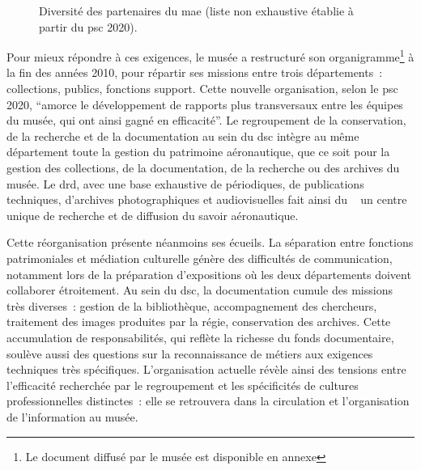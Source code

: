 \begin{figure}[htbp]
	
	\caption{Diversité des partenaires du \ac{mae} (liste non exhaustive établie à partir du \ac{psc} 2020).}
	\label{fig:schem_partenaires}
\end{figure}

Pour mieux répondre à ces exigences, le musée a restructuré son organigramme\footnote{Le document diffusé par le musée est disponible en annexe } à la fin des années 2010, pour répartir ses missions entre trois départements~: collections, publics, fonctions support. Cette nouvelle organisation, selon le \ac{psc} 2020, \enquote{amorce le développement de rapports plus transversaux entre les équipes du musée, qui ont ainsi gagné en efficacité}. Le regroupement de la conservation, de la recherche et de la documentation au sein du \ac{dsc} intègre au même département toute la gestion du patrimoine aéronautique, que ce soit pour la gestion des collections, de la documentation, de la recherche  ou des archives du musée. Le \acf{drd}, avec une base exhaustive de périodiques, de publications techniques, d'archives photographiques et audiovisuelles fait ainsi du \mae~ un centre unique de recherche et de diffusion du savoir aéronautique.

Cette réorganisation présente néanmoins ses écueils. La séparation entre fonctions patrimoniales et médiation culturelle génère des difficultés de communication, notamment lors de la préparation d'expositions où les deux départements doivent collaborer étroitement. Au sein du \ac{dsc}, la documentation cumule des missions très diverses~: gestion de la bibliothèque, accompagnement des chercheurs, traitement des images produites par la régie, conservation des archives. Cette accumulation de responsabilités, qui reflète la richesse du fonds documentaire, soulève aussi des questions sur la reconnaissance de métiers aux exigences techniques très spécifiques. L'organisation actuelle révèle ainsi des tensions entre l'efficacité recherchée par le regroupement et les spécificités de cultures professionnelles distinctes~: elle se retrouvera dans la circulation et l'organisation de l'information au musée.